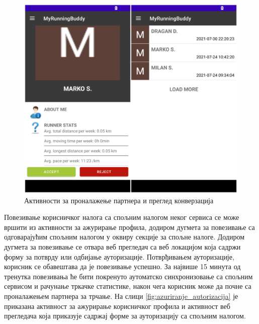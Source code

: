 \documentclass[12pt,oneside]{memoir}
\begin{document}
\begin{figure}[!ht]
  \centering
  \includegraphics[scale=0.7]{slike/pretraga-konverzacija.png}
  \caption{Активности за проналажење партнера и преглед конверзација}
  \label{fig:pretraga_konverzacija}
\end{figure}

Повезивање корисничког налога са спољним налогом неког сервиса се може вршити из активности за ажурирање профила, додиром дугмета за повезивање са одговарајућим спољним налогом у оквиру секције за спољне налоге. Додиром дугмета за повезивање се отвара веб прегледач са веб локацијом која садржи форму за потврду или одбијање ауторизације. Потврђивањем ауторизације, корисник се обавештава да је повезивање успешно. За највише 15 минута од тренутка повезивања ће бити покренуто аутоматско синхронизовање са спољним сервисом и рачунање тркачке статистике, након чега корисник може да почне са проналажењем партнера за трчање. На слици \ref{fig:azuriranje_autorizacija} је приказана активност за ажурирање корисничког профила и активност веб прегледача која приказује садржај форме за ауторизацију са спољним налогом.
\end{document}
